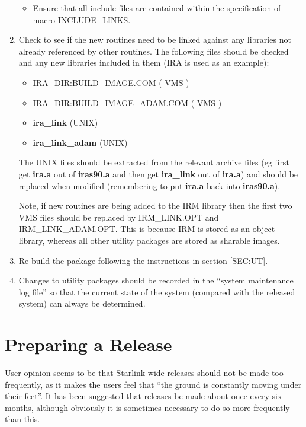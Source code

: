 \begin{enumerate}
\begin{itemize}
\item Ensure that all include files are contained within the specification of 
macro {\small INCLUDE\_LINKS}.

\end{itemize}

\item Check to see if the new routines need to be linked against any libraries 
not already referenced by other routines. The following files should be checked 
and any new libraries included in them ({\small IRA} is used as an example):

\begin{itemize}
\item {\small IRA\_DIR:BUILD\_IMAGE.COM ( VMS )}
\item {\small IRA\_DIR:BUILD\_IMAGE\_ADAM.COM ( VMS )}
\item {\bf ira\_link} ({\small UNIX})
\item {\bf ira\_link\_adam} ({\small UNIX})
\end{itemize}

The {\small UNIX} files should be extracted from the relevant archive files (eg
first get {\bf ira.a} out of {\bf iras90.a} and then get {\bf ira\_link} out of
{\bf ira.a}) and should be replaced when modified (remembering to put {\bf 
ira.a} back into {\bf iras90.a}). 

Note, if new routines are being added to the {\small IRM} library then the first
two {\small VMS} files should be replaced by {\small IRM\_LINK.OPT} and {\small
IRM\_LINK\_ADAM.OPT}. This is because {\small IRM} is stored as an object
library, whereas all other utility packages are stored as sharable images. 

\item Re-build the package following the instructions in section \ref{SEC:UT}.

\item Changes to utility packages should be recorded in the ``system maintenance log
file'' so that the current state of the system (compared with the released
system) can always be determined. 
\end{enumerate}

\section{Preparing a Release}
User opinion seems to be that Starlink-wide releases should not be made too
frequently, as it makes the users feel that ``the ground is constantly moving
under their feet''. It has been suggested that releases be made about once every
six months, although obviously it is sometimes necessary to do so more
frequently than this.

